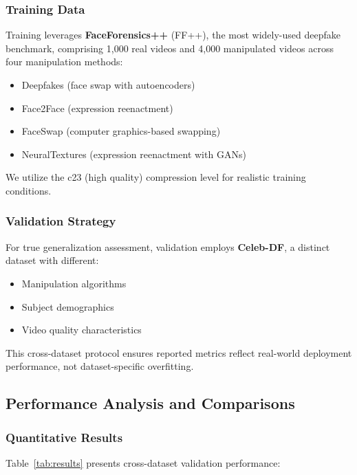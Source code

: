 \documentclass[11pt,a4paper]{article}
\begin{document}
\subsubsection{Training Data}

Training leverages \textbf{FaceForensics++} (FF++), the most widely-used deepfake benchmark, comprising 1,000 real videos and 4,000 manipulated videos across four manipulation methods:

\begin{itemize}
    \item Deepfakes (face swap with autoencoders)
    \item Face2Face (expression reenactment)
    \item FaceSwap (computer graphics-based swapping)
    \item NeuralTextures (expression reenactment with GANs)
\end{itemize}

We utilize the c23 (high quality) compression level for realistic training conditions.

\subsubsection{Validation Strategy}

For true generalization assessment, validation employs \textbf{Celeb-DF}, a distinct dataset with different:
\begin{itemize}
    \item Manipulation algorithms
    \item Subject demographics
    \item Video quality characteristics
\end{itemize}

This cross-dataset protocol ensures reported metrics reflect real-world deployment performance, not dataset-specific overfitting.

\subsection{Performance Analysis and Comparisons}

\subsubsection{Quantitative Results}

Table~\ref{tab:results} presents cross-dataset validation performance:
\end{document}
